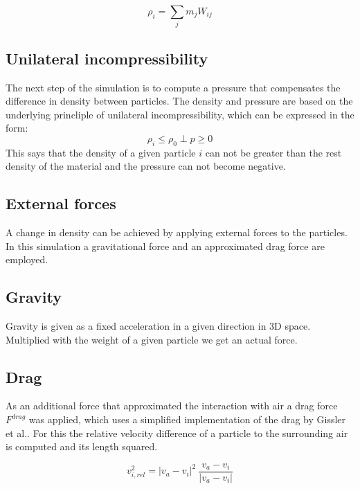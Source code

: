\documentclass[intern]{cgMA}
\begin{document}
    \begin{equation}
        \rho_i = \sum_j m_j W_{ij}
    \end{equation}

    \subsection{Unilateral incompressibility}  
    The next step of the simulation is to compute a pressure that compensates the difference in density between particles. The density and pressure are based on the underlying princliple of unilateral incompressibility, which can be expressed in the form: 
    \begin{equation}
        \rho_i \leq \rho_0 \; \bot \;  p \geq 0
    \end{equation}
    This says that the density of a given particle $i$ can not be greater than the rest density of the material and the pressure can not become negative. \cite{10.1145/2019406.2019410}

    \subsection{External forces}
    A change in density can be achieved by applying external forces to the particles. In this simulation a gravitational force and an approximated drag force are employed.
    \subsection{Gravity}
    Gravity is given as a fixed acceleration in a given direction in 3D space. Multiplied with the weight of a given particle we get an actual force.
    \subsection{Drag}
    As an additional force that approximated the interaction with air a drag force $F^{drag}$ was applied, which uses a simplified implementation of the drag by Gissler et al.\cite{10.1016/j.cag.2017.09.002}. For this the relative velocity difference of a particle to the surrounding air is computed and its length squared. 

    \begin{equation}
        \label{eq:v_rel}
        v^2_{i,rel} = |v_a - v_i|^2\ \frac{v_a - v_i}{|v_a - v_i|}
    \end{equation}
\end{document}
